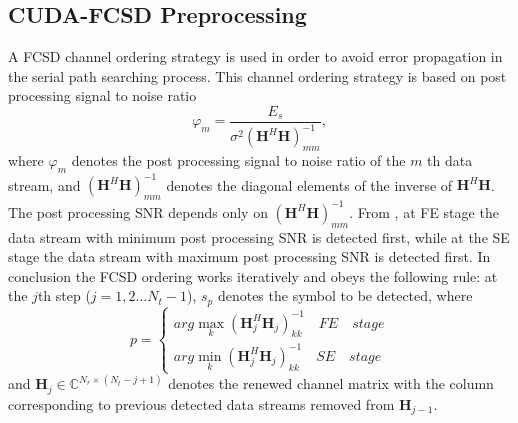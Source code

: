 \documentclass[letterpaper, 10pt, conference, twoside]{ieeeconf}
\begin{document}
\subsection{CUDA-FCSD Preprocessing}
A FCSD channel ordering strategy is used in order to avoid error propagation in the serial path searching process. This channel ordering strategy is based on post processing signal to noise ratio\cite{wolniansky1998v}
\begin{equation}
\varphi_{m}=\frac{E_{s}}{\sigma^{2}(\mathbf{H}^{H}\mathbf{H})_{mm}^{-1}},  \label{ppsnr}
\end{equation}
where $\varphi_{m}$ denotes the post processing signal to noise ratio of the $m$ th data stream, and $(\mathbf{H}^{H}\mathbf{H})_{mm}^{-1}$ denotes the diagonal elements of the inverse of $\mathbf{H}^{H}\mathbf{H}$. The post processing SNR depends only on $(\mathbf{H}^{H}\mathbf{H})_{mm}^{-1}$. From \cite{barbero2008fixing}, at FE stage the data stream with minimum post processing SNR is detected first, while at the SE stage the data stream with maximum post processing SNR is detected first. In conclusion the FCSD ordering works iteratively and obeys the following rule:
at the $j$th step ($j=1,2\dots N_{t}-1$), $s_{p}$ denotes the symbol to be detected, where 
\begin{equation}
p=\left\lbrace \begin{array}{c}
arg\max_{k}(\mathbf{H}_{j}^{H}\mathbf{H}_{j})_{kk}^{-1}\quad FE\quad stage\\
arg\min_{k}(\mathbf{H}_{j}^{H}\mathbf{H}_{j})_{kk}^{-1}\quad SE\quad stage   \label{the ordering}
\end{array}\right.  
\end{equation}  
and $\mathbf{H}_{j}\in \mathbb{C}^{N_{r}\times (N_{t}-j+1)}$ denotes the renewed channel matrix with the column corresponding to previous detected data streams removed from $\mathbf{H}_{j-1}$.
\end{document}
